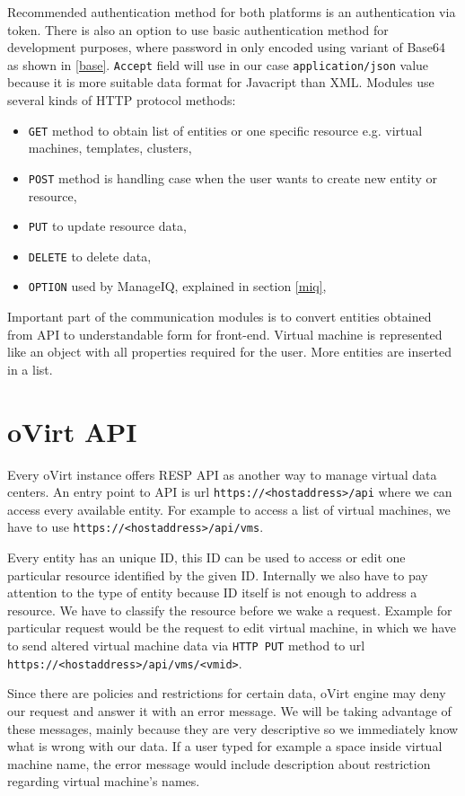 Recommended authentication method for both platforms is an authentication via token. There is also an option to use basic authentication method for development purposes, where password in only encoded using variant of Base64 as shown in \ref{base}.
\texttt{Accept} field will use in our case \texttt{application/json} value because it is more suitable data format for Javacript than XML. Modules use several kinds of HTTP protocol methods: 
\begin{itemize}
\item \texttt{GET} method to obtain list of entities or one specific resource e.g. virtual machines, templates, clusters,
\item \texttt{POST} method is handling case when the user wants to create new entity or resource,
\item \texttt{PUT} to update resource data,
\item \texttt{DELETE} to delete data,
\item \texttt{OPTION} used by ManageIQ, explained in section \ref{miq},
\end{itemize}

Important part of the communication modules is to convert entities obtained from API to understandable form for front-end. Virtual machine is represented like an object with all properties required for the user. More entities are inserted in a list.

\section{oVirt API}
Every oVirt instance offers RESP API as another way to manage virtual data centers. An entry point to API is url \texttt{https://<hostaddress>/api} where we can access every available entity. For example to access a list of virtual machines, we have to use \texttt{https://<hostaddress>/api/vms}.

Every entity has an unique ID, this ID can be used to access or edit one particular resource identified by the given ID. Internally we also have to pay attention to the type of entity because ID itself is not enough to address a resource. We have to classify the resource before we wake a request. Example for particular request would be the request to edit virtual machine, in which we have to send altered virtual machine data via \texttt{HTTP PUT} method to url \texttt{https://<hostaddress>/api/vms/<vmid>}.

Since there are policies and restrictions for certain data, oVirt engine may deny our request and answer it with an error message. We will be taking advantage of these messages, mainly because they are very descriptive so we immediately know what is wrong with our data. If a user typed for example a space inside virtual machine name, the error message would include description about restriction regarding virtual machine's names. 

